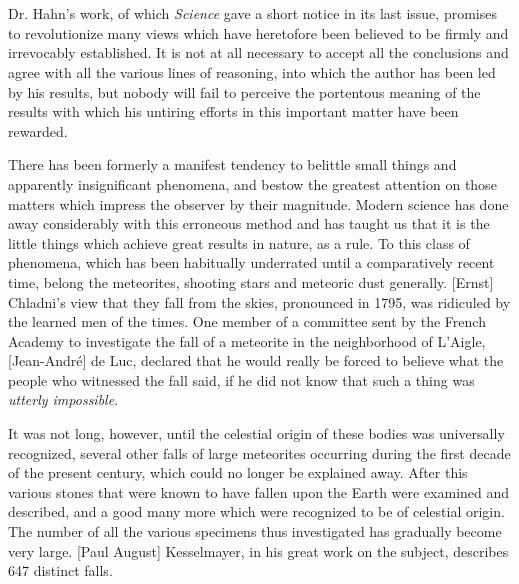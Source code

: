 \documentclass[a4paper, 12pt, oneside]{article}
\begin{document}
\section{}
\subsection{}
\paragraph*{}
Dr. Hahn's work, of which \emph{Science} gave a short notice in its last issue, promises to revolutionize many views which have heretofore been believed to be firmly and irrevocably established. It is not at all necessary to accept all the conclusions and agree with all the various lines of reasoning, into which the author has been led by his results, but nobody will fail to perceive the portentous meaning of the results with which his untiring efforts in this important matter have been rewarded.

There has been formerly a manifest tendency to belittle small things and apparently insignificant phenomena, and bestow the greatest attention on those matters which impress the observer by their magnitude. Modern science has done away considerably with this erroneous method and has taught us that it is the little things which achieve great results in nature, as a rule. To this class of phenomena, which has been habitually underrated until a comparatively recent time, belong the meteorites, shooting stars and meteoric dust generally. [Ernst] Chladni's view that they fall from the skies, pronounced in 1795, was ridiculed by the learned men of the times. One member of a committee sent by the French Academy to investigate the fall of a meteorite in the neighborhood of L'Aigle, [Jean-André] de Luc, declared that he would really be forced to believe what the people who witnessed the fall said, if he did not know that such a thing was \emph{utterly impossible}.

It was not long, however, until the celestial origin of these bodies was universally recognized, several other falls of large meteorites occurring during the first decade of the present century, which could no longer be explained away. After this various stones that were known to have fallen upon the Earth were examined and described, and a good many more which were recognized to be of celestial origin. The number of all the various specimens thus investigated has gradually become very large. [Paul August] Kesselmayer, in his great work on the subject, describes 647 distinct falls.
\end{document}
